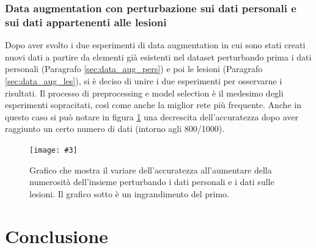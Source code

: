 \documentclass[12pt, twoside, letterpaper]{report}
\newcommand{\img}[4] {
	\begin{figure}
		\centering
		\texttt{[image: \#3]}\\
		\caption{#1}
		\label{fig:#4}
	\end{figure}
}
\begin{document}
		\subsection{Data augmentation con perturbazione sui dati personali e sui dati appartenenti alle lesioni}
			Dopo aver svolto i due esperimenti di data augmentation in cui sono stati creati nuovi dati a partire da elementi già esistenti nel dataset perturbando prima i dati personali (Paragrafo \ref{sec:data_aug_pers}) e poi le lesioni (Paragrafo \ref{sec:data_aug_les}), si è deciso di unire i due esperimenti per osservarne i risultati. Il processo di preprocessing e model selection è il medesimo degli esperimenti sopracitati, così come anche la miglior rete più frequente. Anche in questo caso si può notare in figura \ref{fig:acc_data_aug_both} una decrescita dell'accuratezza dopo aver raggiunto un certo numero di dati (intorno agli 800/1000).
			\img{Grafico che mostra il variare dell'accuratezza all'aumentare della numerosità dell'insieme perturbando i dati personali e i dati sulle lesioni. Il grafico sotto è un ingrandimento del primo.}{0.35}{acc_data_aug_both_.png}{acc_data_aug_both}
			
			
			
	\chapter*{Conclusione}	  
	
\end{document}
